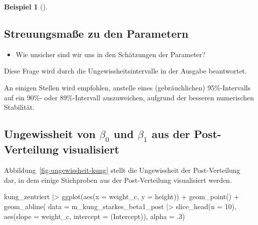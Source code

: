\documentclass[
  ngerman,
  letterpaper,
  twoside,
  open=any]{scrbook}
\newenvironment{Shaded}{\begin{snugshade}}{\end{snugshade}}
\newcommand{\AttributeTok}[1]{\textcolor[rgb]{0.40,0.45,0.13}{#1}}
\newcommand{\DecValTok}[1]{\textcolor[rgb]{0.68,0.00,0.00}{#1}}
\newcommand{\FunctionTok}[1]{\textcolor[rgb]{0.28,0.35,0.67}{#1}}
\newcommand{\NormalTok}[1]{\textcolor[rgb]{0.00,0.23,0.31}{#1}}
\newcommand{\SpecialCharTok}[1]{\textcolor[rgb]{0.37,0.37,0.37}{#1}}
\newcommand{\StringTok}[1]{\textcolor[rgb]{0.13,0.47,0.30}{#1}}
\providecommand{\tightlist}{%
  \setlength{\itemsep}{0pt}\setlength{\parskip}{0pt}}\usepackage{longtable,booktabs,array}
\theoremstyle{definition}
\newtheorem{example}{Beispiel}[chapter]
\theoremstyle{plain}
\theoremstyle{definition}
\theoremstyle{definition}
\theoremstyle{remark}
\begin{document}
\begin{example}[]
\subsection{Streuungsmaße zu den
Parametern}\label{streuungsmauxdfe-zu-den-parametern}

\begin{itemize}
\tightlist
\item
  Wie unsicher sind wir uns in den Schätzungen der Parameter?
\end{itemize}

Diese Frage wird durch die Ungewissheitsintervalle in der Ausgabe
beantwortet.

\begin{tcolorbox}[enhanced jigsaw, arc=.35mm, bottomrule=.15mm, bottomtitle=1mm, breakable, colback=white, colbacktitle=quarto-callout-note-color!10!white, colframe=quarto-callout-note-color-frame, coltitle=black, left=2mm, leftrule=.75mm, opacityback=0, opacitybacktitle=0.6, rightrule=.15mm, title=\textcolor{quarto-callout-note-color}{\faInfo}\hspace{0.5em}{Hinweis}, titlerule=0mm, toprule=.15mm, toptitle=1mm]

An einigen Stellen wird empfohlen, anstelle eines (gebräuchlichen)
95\%-Intervalls auf ein 90\%- oder 89\%-Intervall auszuweichen, aufgrund
der besseren numerischen Stabilität.

\end{tcolorbox}

\subsection{\texorpdfstring{Ungewissheit von \(\beta_0\) und \(\beta_1\)
aus der Post-Verteilung
visualisiert}{Ungewissheit von \textbackslash beta\_0 und \textbackslash beta\_1 aus der Post-Verteilung visualisiert}}\label{ungewissheit-von-beta_0-und-beta_1-aus-der-post-verteilung-visualisiert}

Abbildung~\ref{fig-ungewissheit-kung} stellt die Ungewissheit der
Post-Verteilung dar, in dem einige Stichproben aus der Post-Verteilung
visualisiert werden.

\begin{Shaded}
\begin{Highlighting}[]
\NormalTok{kung\_zentriert }\SpecialCharTok{|\textgreater{}}
  \FunctionTok{ggplot}\NormalTok{(}\FunctionTok{aes}\NormalTok{(}\AttributeTok{x =}\NormalTok{ weight\_c, }\AttributeTok{y =}\NormalTok{ height)) }\SpecialCharTok{+}
  \FunctionTok{geom\_point}\NormalTok{() }\SpecialCharTok{+}
  \FunctionTok{geom\_abline}\NormalTok{(}
    \AttributeTok{data =}\NormalTok{ m\_kung\_starkes\_beta1\_post }\SpecialCharTok{|\textgreater{}} \FunctionTok{slice\_head}\NormalTok{(}\AttributeTok{n =} \DecValTok{10}\NormalTok{),}
    \FunctionTok{aes}\NormalTok{(}\AttributeTok{slope =}\NormalTok{ weight\_c, }\AttributeTok{intercept =} \StringTok{\textasciigrave{}}\AttributeTok{(Intercept)}\StringTok{\textasciigrave{}}\NormalTok{),}
    \AttributeTok{alpha =}\NormalTok{ .}\DecValTok{3}\NormalTok{)}


\end{Highlighting}
\end{Shaded}
\end{example}
\end{document}
